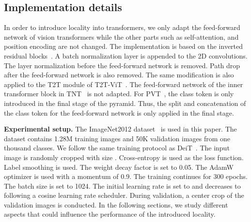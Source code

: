 \documentclass[10pt,twocolumn,letterpaper]{article}
\begin{document}
\subsection{Implementation details}
\label{subsec:implementation_details}

In order to introduce locality into transformers, we only adapt the feed-forward network of vision transformers while the other parts such as self-attention, and position encoding are not changed. The implementation is based on the inverted residual blocks~\cite{sandler2018mobilenetv2,howard2019searching}. A batch normalization layer is appended to the 2D convolutions. The layer normalization before the feed-forward network is removed. Path drop after the feed-forward network is also removed. The same modification is also applied to the T2T module of T2T-ViT~\cite{yuan2021tokens}. The feed-forward network of the inner transformer block in TNT~\cite{han2021transformer} is not adapted. For PVT~\cite{wang2021pyramid}, the class token is only introduced in the final stage of the pyramid. Thus, the split and concatenation of the class token for the feed-forward network is only applied in the final stage.

\textbf{Experimental setup.} The ImageNet2012 dataset~\cite{deng2009imagenet} is used in this paper. The dataset contains 1.28M training images and 50K validation images from one thousand classes. We follow the same training protocol as DeiT~\cite{touvron2020training}.
The input image is randomly cropped with size . Cross-entropy is used as the loss function. Label smoothing is used. The weight decay factor is set to 0.05. The AdamW optimizer is used with a momentum of 0.9. The training continues for 300 epochs. The batch size is set to 1024. The initial learning rate is set to 
and decreases to  following a cosine learning rate scheduler. During validation, a center crop of the validation images is conducted.
In the following sections, we study different aspects that could influence the performance of the introduced locality.
\end{document}
